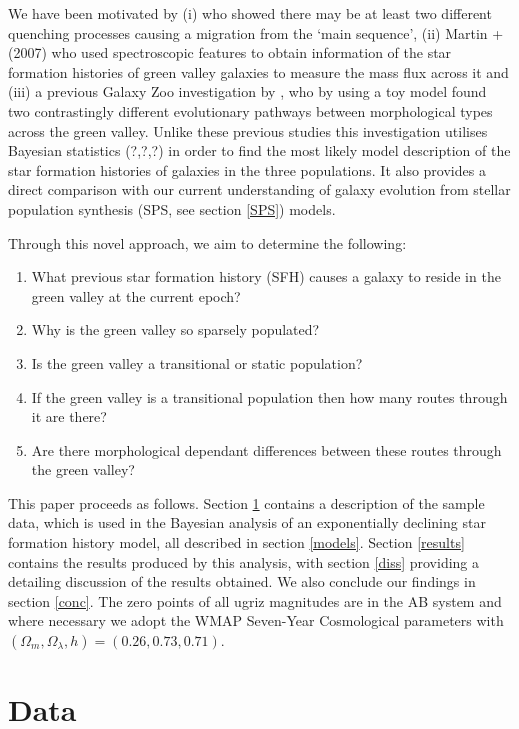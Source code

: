 \documentclass{mn2e}
\begin{document}
We have been motivated by (i) \citet{Peng} who showed there may be at least two different quenching processes causing a migration from the `main sequence', (ii) Martin +(2007) who used spectroscopic features to obtain information of the star formation histories of green valley galaxies to measure the mass flux across it and (iii) a previous Galaxy Zoo investigation by  \cite{Sch2014}, who by using a toy model found two contrastingly different evolutionary pathways between morphological types across the green valley. Unlike these previous studies this investigation utilises Bayesian statistics (?,?,?) in order to find the most likely model description of the star formation histories of galaxies in the three populations. It also provides a direct comparison with our current understanding of galaxy evolution from stellar population synthesis (SPS, see section \ref{SPS}) models. 

Through this novel approach, we aim to determine the following:
\begin{enumerate}
\item What previous star formation history (SFH) causes a galaxy to reside in the green valley at the current epoch?
\item Why is the green valley so sparsely populated?
\item Is the green valley a transitional or static population? 
\item If the green valley is a transitional population then how many routes through it are there? 
\item Are there morphological dependant differences between these routes through the green valley? 
\end{enumerate}

This paper proceeds as follows. Section \ref{data} contains a description of the sample data, which is used in the Bayesian analysis of an exponentially declining star formation history model, all described in section \ref{models}. Section \ref{results} contains the results produced by this analysis, with section \ref{diss} providing a detailing discussion of the results obtained. We also conclude our findings in section \ref{conc}. The zero points of all ugriz magnitudes are in the AB system and where necessary we adopt the WMAP Seven-Year Cosmological parameters \citep{WMAP} with $(\Omega_m, \Omega_{\lambda}, h) = (0.26, 0.73, 0.71)$. 

\section{Data}\label{data}
\end{document}
